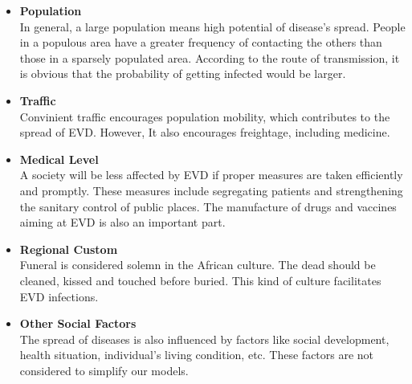 \begin{itemize}
  \item \textbf{Population}\\In general, a large population means high potential of disease's spread. People in a populous area have a greater frequency of contacting the others than those in a sparsely populated area. According to the route of transmission, it is obvious that the probability of getting infected would be larger.
   
  \item \textbf{Traffic}\\Convinient traffic encourages population mobility, which contributes to the spread of EVD. However, It also encourages freightage, including medicine.
  
  \item \textbf{Medical Level}\\A society will be less affected by EVD if proper measures are taken efficiently and promptly.
   These measures include segregating patients and strengthening the sanitary control of public places. The manufacture of drugs and vaccines aiming at EVD is also an important part.
  
  \item \textbf{Regional Custom}\\Funeral is considered solemn in the African culture. The dead should be cleaned, kissed and touched before buried. This kind of culture facilitates EVD infections.
  
  \item \textbf{Other Social Factors}\\The spread of diseases is also influenced by factors like social development, health situation, individual's living condition, etc. These factors are not considered to simplify our models.
\end{itemize}